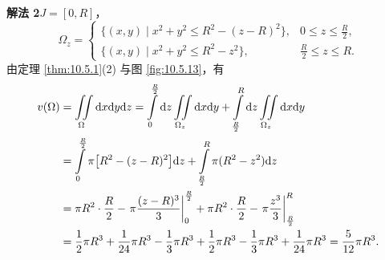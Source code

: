 \noindent\textbf{解法 2}\quad $J = [0, R]$，
\[
\Omega_z =
\begin{cases}
\bigl\{ (x, y) \mid x^2 + y^2 \leqslant R^2 - (z - R)^2 \bigr\}, & 0 \leqslant z \leqslant \frac{R}{2},\\[4pt]
\bigl\{ (x, y) \mid x^2 + y^2 \leqslant R^2 - z^2 \bigr\}, & \frac{R}{2} \leqslant z \leqslant R.
\end{cases}
\]
由定理 \ref{thm:10.5.1}(2) 与图 \ref{fig:10.5.13}，有
\begin{align*}
v(\Omega)
&= \iint \limits_{\Omega} \mathrm{d}x \mathrm{d}y \mathrm{d}z
 = \int \limits_0^{\frac{R}{2}} \mathrm{d}z \iint \limits_{\Omega_z} \mathrm{d}x \mathrm{d}y
   + \int \limits_{\frac{R}{2}}^{R} \mathrm{d}z \iint \limits_{\Omega_z} \mathrm{d}x \mathrm{d}y \notag\\
&= \int \limits_0^{\frac{R}{2}} \pi \bigl[ R^2 - (z - R)^2 \bigr] \mathrm{d}z
   + \int \limits_{\frac{R}{2}}^{R} \pi (R^2 - z^2) \mathrm{d}z \notag\\
&= \pi R^2 \cdot \frac{R}{2}
   - \left. \pi \frac{(z - R)^3}{3} \right|_0^{\frac{R}{2}}
   + \pi R^2 \cdot \frac{R}{2}
   - \left. \pi \frac{z^3}{3} \right|_{\frac{R}{2}}^{R} \notag\\
&= \frac{1}{2} \pi R^3 + \frac{1}{24} \pi R^3 - \frac{1}{3} \pi R^3
   + \frac{1}{2} \pi R^3 - \frac{1}{3} \pi R^3 + \frac{1}{24} \pi R^3
 = \frac{5}{12} \pi R^3.
\end{align*}

